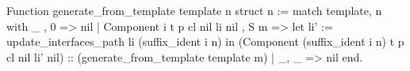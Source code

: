 Function generate_from_template template n {struct n} := 
 match template, n with 
   _                               , 0   => nil
 | Component i t p cl nil li nil   , S m => 
   let li' := update_interfaces_path li (suffix_ident i n) in
       (Component (suffix_ident i n) t p cl nil li' nil) :: 
       (generate_from_template template m)
   | _, _ => nil
  end.